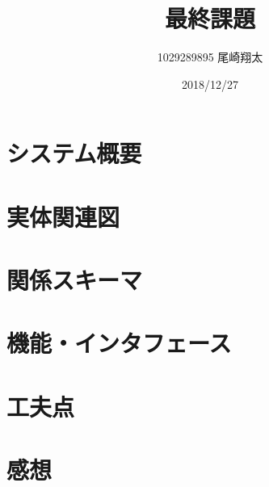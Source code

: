 \documentclass{jarticle}
\begin{document}
\title{最終課題}
\author{1029289895 尾崎翔太}
\date{2018/12/27}

\maketitle
\newpage

\section{システム概要}

\section{実体関連図}
\section{関係スキーマ}
\section{機能・インタフェース}
\section{工夫点}
\section{感想}
\end{document}
